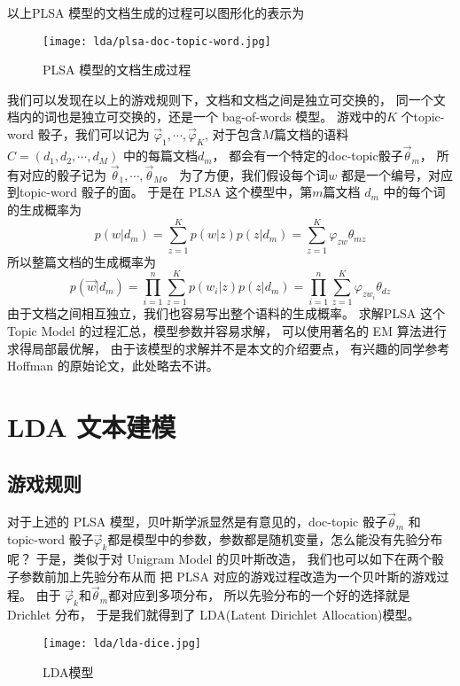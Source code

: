 以上PLSA 模型的文档生成的过程可以图形化的表示为
\begin{figure}[H]
\centering
\texttt{[image: lda/plsa-doc-topic-word.jpg]}
\caption{PLSA 模型的文档生成过程}
\end{figure}

我们可以发现在以上的游戏规则下，文档和文档之间是独立可交换的，
同一个文档内的词也是独立可交换的，还是一个 bag-of-words 模型。
游戏中的$K$ 个topic-word 骰子，我们可以记为 $\vec{\varphi}_1, \cdots, \vec{\varphi}_K$,
对于包含$M$篇文档的语料 $C=(d_1, d_2, \cdots, d_M)$ 中的每篇文档$d_m$，
都会有一个特定的doc-topic骰子$\vec{\theta}_m$，
所有对应的骰子记为 $\vec{\theta}_1, \cdots, \vec{\theta}_M$。
为了方便，我们假设每个词$w$ 都是一个编号，对应到topic-word 骰子的面。
于是在 PLSA 这个模型中，第$m$篇文档 $d_m$ 中的每个词的生成概率为
$$ p(w|d_m) = \sum_{z=1}^K p(w|z)p(z|d_m) = \sum_{z=1}^K \varphi_{zw} \theta_{mz}$$
所以整篇文档的生成概率为
$$ p(\vec{w}|d_m) = \prod_{i=1}^n \sum_{z=1}^K p(w_i|z)p(z|d_m) =
\prod_{i=1}^n \sum_{z=1}^K \varphi_{zw_i} \theta_{dz} $$
由于文档之间相互独立，我们也容易写出整个语料的生成概率。
求解PLSA 这个 Topic Model 的过程汇总，模型参数并容易求解，
可以使用著名的 EM 算法进行求得局部最优解，
由于该模型的求解并不是本文的介绍要点，
有兴趣的同学参考 Hoffman 的原始论文，此处略去不讲。

\section{LDA 文本建模}

\subsection{游戏规则}
对于上述的 PLSA 模型，贝叶斯学派显然是有意见的，doc-topic 骰子$\vec{\theta}_m$
和 topic-word 骰子$\vec{\varphi}_k$都是模型中的参数，参数都是随机变量，怎么能没有先验分布呢？
于是，类似于对 Unigram Model 的贝叶斯改造， 我们也可以如下在两个骰子参数前加上先验分布从而
把 PLSA 对应的游戏过程改造为一个贝叶斯的游戏过程。
由于 $\vec{\varphi}_k$和$\vec{\theta}_m$都对应到多项分布，
所以先验分布的一个好的选择就是Drichlet 分布，
于是我们就得到了 LDA(Latent Dirichlet Allocation)模型。
\begin{figure}[htbp]
\centering
\texttt{[image: lda/lda-dice.jpg]}
\caption{LDA模型}
\end{figure}

